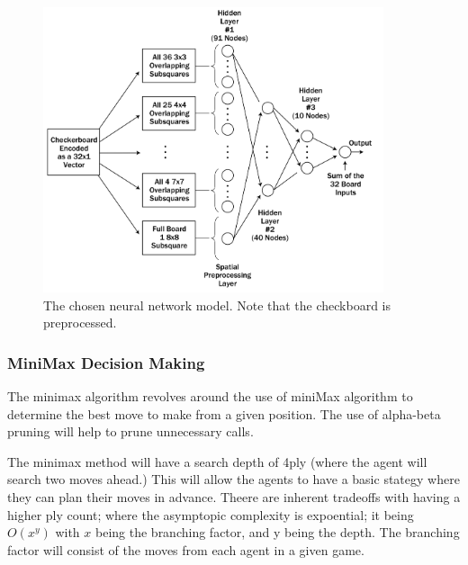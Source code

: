 \documentclass[12pt,a4paper]{article}
\begin{document}
\begin{figure}[ht!]
    \centering
    \includegraphics[width=100mm]{nnmodel.png}
    \caption{The chosen neural network model. Note that the checkboard is preprocessed. \label{overflow}}
\end{figure}

\subsubsection{MiniMax Decision Making}

The minimax algorithm revolves around the use of miniMax algorithm to determine the best move to make from a given position. The use of alpha-beta pruning will help to prune unnecessary calls.

The minimax method will have a search depth of 4ply (where the agent will search two moves ahead.) This will allow the agents to have a basic stategy where they can plan their moves in advance. Theere are inherent tradeoffs with having a higher ply count; where the asymptopic complexity is expoential; it being $O(x^y)$ with $x$ being the branching factor, and y being the depth. The branching factor will consist of the moves from each agent in a given game.
\end{document}
